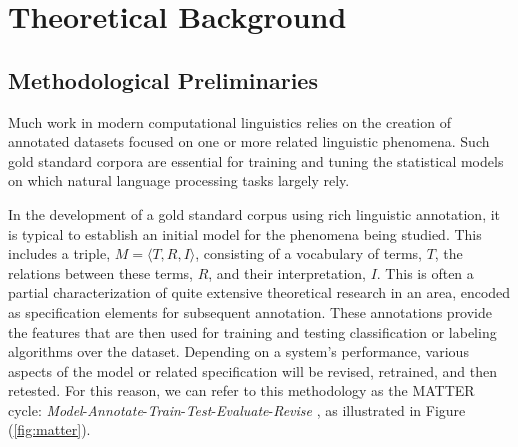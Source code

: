 \documentclass[10pt]{article}
\begin{document}

\vspace{-.15in}
\section{Theoretical Background}
\vspace{-.1in}
\subsection{Methodological Preliminaries\label{prelim}}
Much work in modern computational linguistics relies on the creation of annotated datasets focused on one or more related linguistic phenomena. Such gold standard corpora are essential for training and tuning the statistical models on which natural language processing tasks largely rely.

In the development of a gold standard corpus using rich linguistic annotation, it is typical to establish an initial model for the phenomena being studied. This includes a triple, $M = \langle T,R,I \rangle$, consisting of a
vocabulary of terms, $T$, the relations between these terms, $R$, and their interpretation,
$I$. This is often a partial  characterization of quite extensive theoretical research in an area, encoded as specification elements for subsequent annotation. These annotations provide the features that are then used for training and testing classification or labeling algorithms over the dataset. Depending on a system's performance, various aspects of the model or related specification will be revised, retrained, and then retested. 
For this reason, we can refer to this methodology as the MATTER cycle: {\it Model}-{\it Annotate}-{\it Train}-{\it Test}-{\it Evaluate}-{\it Revise}  \cite{pustejovsky2012natural}, as illustrated in Figure (\ref{fig:matter}). 
\end{document}
